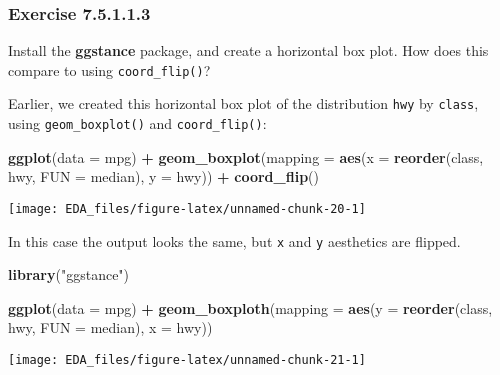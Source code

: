 \documentclass[]{book}
\newenvironment{Shaded}{\begin{snugshade}}{\end{snugshade}}
\newcommand{\DataTypeTok}[1]{\textcolor[rgb]{0.13,0.29,0.53}{#1}}
\newcommand{\KeywordTok}[1]{\textcolor[rgb]{0.13,0.29,0.53}{\textbf{#1}}}
\newcommand{\NormalTok}[1]{#1}
\newcommand{\OperatorTok}[1]{\textcolor[rgb]{0.81,0.36,0.00}{\textbf{#1}}}
\newcommand{\StringTok}[1]{\textcolor[rgb]{0.31,0.60,0.02}{#1}}
\theoremstyle{plain}
\theoremstyle{remark}
\begin{document}
\hypertarget{exercise-7.5.1.1.3}{%
\subsubsection*{\texorpdfstring{Exercise
{7.5.1.1.3}}{Exercise 7.5.1.1.3}}\label{exercise-7.5.1.1.3}}

Install the \textbf{ggstance} package, and create a horizontal box plot.
How does this compare to using \texttt{coord\_flip()}?

Earlier, we created this horizontal box plot of the distribution
\texttt{hwy} by \texttt{class}, using \texttt{geom\_boxplot()} and
\texttt{coord\_flip()}:

\begin{Shaded}
\begin{Highlighting}[]
\KeywordTok{ggplot}\NormalTok{(}\DataTypeTok{data =}\NormalTok{ mpg) }\OperatorTok{+}
\StringTok{  }\KeywordTok{geom_boxplot}\NormalTok{(}\DataTypeTok{mapping =} \KeywordTok{aes}\NormalTok{(}\DataTypeTok{x =} \KeywordTok{reorder}\NormalTok{(class, hwy, }\DataTypeTok{FUN =}\NormalTok{ median), }\DataTypeTok{y =}\NormalTok{ hwy)) }\OperatorTok{+}
\StringTok{  }\KeywordTok{coord_flip}\NormalTok{()}
\end{Highlighting}
\end{Shaded}

\begin{center}\texttt{[image: EDA\_files/figure-latex/unnamed-chunk-20-1]} \end{center}

In this case the output looks the same, but \texttt{x} and \texttt{y}
aesthetics are flipped.

\begin{Shaded}
\begin{Highlighting}[]
\KeywordTok{library}\NormalTok{(}\StringTok{"ggstance"}\NormalTok{)}

\KeywordTok{ggplot}\NormalTok{(}\DataTypeTok{data =}\NormalTok{ mpg) }\OperatorTok{+}
\StringTok{  }\KeywordTok{geom_boxploth}\NormalTok{(}\DataTypeTok{mapping =} \KeywordTok{aes}\NormalTok{(}\DataTypeTok{y =} \KeywordTok{reorder}\NormalTok{(class, hwy, }\DataTypeTok{FUN =}\NormalTok{ median), }\DataTypeTok{x =}\NormalTok{ hwy))}
\end{Highlighting}
\end{Shaded}

\begin{center}\texttt{[image: EDA\_files/figure-latex/unnamed-chunk-21-1]} \end{center}
\end{document}
